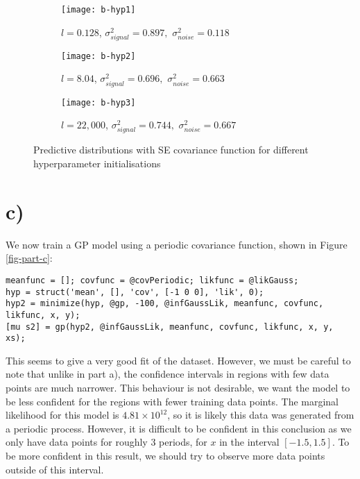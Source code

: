 \documentclass[11pt]{report}
\begin{document}
\begin{figure}[ht]
\centering
\begin{subfigure}{.5\linewidth}
  \centering
  \texttt{[image: b-hyp1]}
  \caption{\label{fig:part-b-short_length}$l = 0.128$, $\sigma_{signal}^{2}=0.897,$ $\sigma_{noise}^{2}=0.118$}
\end{subfigure}%
\begin{subfigure}{.5\linewidth}
  \centering
  \texttt{[image: b-hyp2]}
  \caption{\label{fig:part-b-large_length}$l = 8.04$, $\sigma_{signal}^{2}=0.696,$ $\sigma_{noise}^{2}=0.663$}
\end{subfigure}
\begin{subfigure}{.5\linewidth}
  \centering
  \texttt{[image: b-hyp3]}
  \caption{\label{fig:part-b-very_large_length}$l = 22,000$, $\sigma_{signal}^{2}=0.744,$ $\sigma_{noise}^{2}=0.667$}
\end{subfigure}%
\caption{\label{fig:part-b}Predictive distributions with SE covariance function for different hyperparameter initialisations}
\end{figure}

\section*{c)}

We now train a GP model using a periodic covariance function, shown in Figure \ref{fig-part-c}:
\begin{lstlisting}[basicstyle=\listingsfont]
meanfunc = []; covfunc = @covPeriodic; likfunc = @likGauss;
hyp = struct('mean', [], 'cov', [-1 0 0], 'lik', 0);
hyp2 = minimize(hyp, @gp, -100, @infGaussLik, meanfunc, covfunc, likfunc, x, y);
[mu s2] = gp(hyp2, @infGaussLik, meanfunc, covfunc, likfunc, x, y, xs);
\end{lstlisting}
This seems to give a very good fit of the dataset. However, we must be careful to note that unlike in part a), the confidence intervals in regions with few data points are much narrower. This behaviour is not desirable, we want the model to be less confident for the regions with fewer training data points. The marginal likelihood for this model is $4.81 \times 10^{12}$, so it is likely this data was generated from a periodic process. However, it is difficult to be confident in this conclusion as we only have data points for roughly 3 periods, for $x$ in the interval $[-1.5, 1.5]$. To be more confident in this result, we should try to observe more data points outside of this interval.
\end{document}
